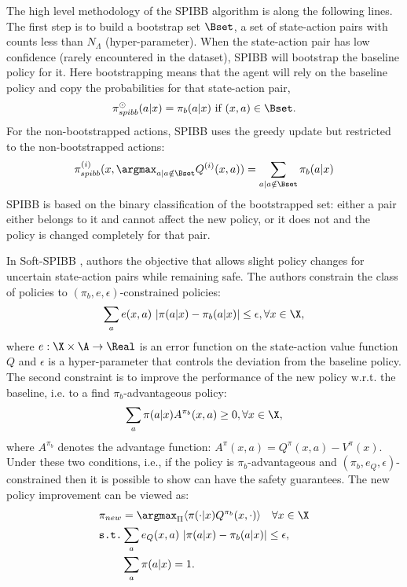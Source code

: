 The high level methodology of the SPIBB algorithm is along the following lines. The first step is to  build a bootstrap set $\Bset$, a set of state-action pairs with counts less than $N_\Lambda$ (hyper-parameter). When the state-action pair has low confidence (rarely encountered in the dataset), SPIBB will bootstrap the baseline policy for it. Here bootstrapping means that the agent will rely on the baseline policy and copy the probabilities for that state-action pair, 
\begin{equation*}
    \pi^{\odot}_{spibb}(a|x) = \pi_b(a|x) \text{ if } (x,a) \in \Bset.
\end{equation*}
For the non-bootstrapped actions, SPIBB uses the greedy update but restricted to the non-bootstrapped actions:
\begin{equation*}
    \pi^{(i)}_{spibb}(x , \argmax_{a \mid a \notin \Bset} Q^{(i)}(x,a)) = \sum_{a \mid a \notin \Bset} \pi_b(a|x)
\end{equation*}
SPIBB is based on the binary classification of the bootstrapped set: either a pair either belongs to it and cannot affect the new policy, or it does not and the policy is changed completely for that pair. 

In Soft-SPIBB \citep{nadjahi2019safe}, authors  the objective that allows slight policy changes for uncertain state-action pairs while remaining safe. The authors constrain the class of policies to $(\pi_b, e, \epsilon)$-constrained policies: 
\begin{equation}
    \sum_a e(x,a)\ |\pi(a|x) - \pi_{b}(a|x)| \leq \epsilon,  \forall x \in \X,
\end{equation}
where $e: \X \times \A \rightarrow \Real$ is an error function on the state-action value function $Q$ and $\epsilon$ is a hyper-parameter that controls the deviation from the baseline policy. The second constraint is to improve the performance of the new policy w.r.t. the baseline, i.e. to a find $\pi_b$-advantageous policy:
\begin{equation}
\label{eq:spibb-performance-constraint}
\sum_a \pi(a|x) A^{\pi_b}(x, a) \geq 0, \forall x \in \X,
\end{equation}
where $A^{\pi_b}$ denotes the advantage function: $A^{\pi}(x,a) = Q^{\pi}(x,a) - V^{\pi}(x)$. Under these two conditions, i.e., if the policy is $\pi_b$-advantageous and $(\pi_b, e_Q, \epsilon)$-constrained then it is possible to show  can have the safety guarantees.  The new policy improvement can be viewed as:
    \begin{align}
        \label{eq:soft-spibb-obj}
        \pi_{new} &= \argmax_{\Pi} \langle \pi(\cdot|x) Q^{\pi_b}(x,\cdot) \rangle \quad \forall x \in \X  \\
        \texttt{s.t.} &\sum_a e_Q(x,a)\ |\pi(a|x) - \pi_{b}(a|x)| \leq \epsilon, \nonumber \\ 
        &\sum_a \pi(a|x) = 1 . \nonumber
    \end{align}


